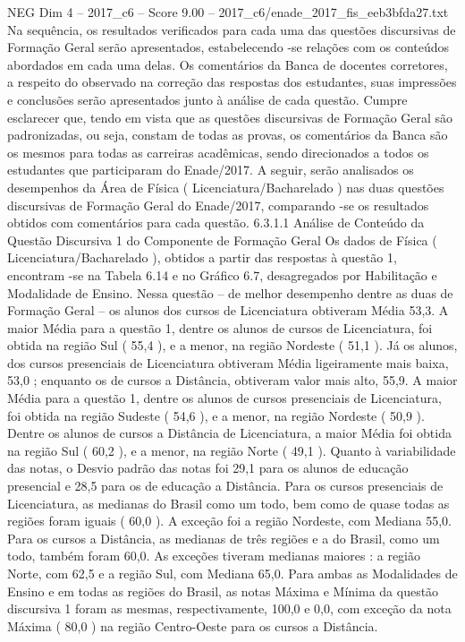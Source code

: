 \begin{textsample}{NEG Dim 4 – 2017\_c6 – Score 9.00 – 2017\_c6/enade\_2017\_fis\_eeb3bfda27.txt}
Na sequência, os resultados verificados para cada uma das questões discursivas de Formação Geral serão apresentados, estabelecendo -se relações com os conteúdos abordados em cada uma delas.
Os comentários da Banca de docentes corretores, a respeito do observado na correção das respostas dos estudantes, suas impressões e conclusões serão apresentados junto à análise de cada questão.
Cumpre esclarecer que, tendo em vista que as questões discursivas de Formação Geral são padronizadas, ou seja, constam de todas as provas, os comentários da Banca são os mesmos para todas as carreiras acadêmicas, sendo direcionados a todos os estudantes que participaram do Enade/2017.
A seguir, serão analisados os desempenhos da Área de Física ( Licenciatura/Bacharelado ) nas duas questões discursivas de Formação Geral do Enade/2017, comparando -se os resultados obtidos com comentários para cada questão. 6.3.1.1 Análise de Conteúdo da Questão Discursiva 1 do Componente de Formação Geral Os dados de Física ( Licenciatura/Bacharelado ), obtidos a partir das respostas à questão 1, encontram -se na Tabela 6.14 e no Gráfico 6.7, desagregados por Habilitação e Modalidade de Ensino.
Nessa questão – de melhor desempenho dentre as duas de Formação Geral – os alunos dos cursos de Licenciatura obtiveram Média 53,3.
A maior Média para a questão 1, dentre os alunos de cursos de Licenciatura, foi obtida na região Sul ( 55,4 ), e a menor, na região Nordeste ( 51,1 ).
Já os alunos, dos cursos presenciais de Licenciatura obtiveram Média ligeiramente mais baixa, 53,0 ; enquanto os de cursos a Distância, obtiveram valor mais alto, 55,9.
A maior Média para a questão 1, dentre os alunos de cursos presenciais de Licenciatura, foi obtida na região Sudeste ( 54,6 ), e a menor, na região Nordeste ( 50,9 ).
Dentre os alunos de cursos a Distância de Licenciatura, a maior Média foi obtida na região Sul ( 60,2 ), e a menor, na região Norte ( 49,1 ).
Quanto à variabilidade das notas, o Desvio padrão das notas foi 29,1 para os alunos de educação presencial e 28,5 para os de educação a Distância.
Para os cursos presenciais de Licenciatura, as medianas do Brasil como um todo, bem como de quase todas as regiões foram iguais ( 60,0 ).
A exceção foi a região Nordeste, com Mediana 55,0.
Para os cursos a Distância, as medianas de três regiões e a do Brasil, como um todo, também foram 60,0.
As exceções tiveram medianas maiores : a região Norte, com 62,5 e a região Sul, com Mediana 65,0.
Para ambas as Modalidades de Ensino e em todas as regiões do Brasil, as notas Máxima e Mínima da questão discursiva 1 foram as mesmas, respectivamente, 100,0 e 0,0, com exceção da nota Máxima ( 80,0 ) na região Centro-Oeste para os cursos a Distância.

\end{textsample}
